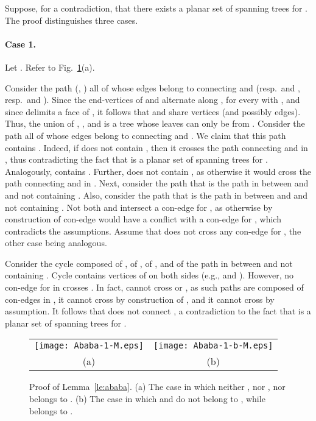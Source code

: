 \documentclass[letter,runningheads]{llncs}
\renewenvironment{proof}
{{\em Proof.\ }}{\hspace*{\fill}\par\vspace{2mm}}
\begin{document}
\begin{proof}
Suppose, for a contradiction, that there exists a planar set  of spanning trees for . The proof distinguishes three cases.

\paragraph{Case 1.} Let . Refer to Fig.~\ref{fig:ababa}(a).

Consider the path  (, ) all of whose edges belong to  connecting  and  (resp.\  and , resp.\  and ). Since the end-vertices of  and  alternate along , for every  with , and since  delimits a face of , it follows that  and  share vertices (and possibly edges). Thus, the union of , , and  is a tree  whose leaves can only be from . Consider the path  all of whose edges belong to  connecting  and . We claim that this path contains . Indeed, if  does not contain , then it crosses the path connecting  and  in , thus contradicting the fact that  is a planar set of spanning trees for . Analogously,  contains . Further,  does not contain , as otherwise it would cross the path connecting  and  in . Next, consider the path  that is the path in  between  and  and not containing . Also, consider the path  that is the path in  between  and  and not containing . Not both  and  intersect a con-edge for , as otherwise by construction of  con-edge  would have a conflict with a con-edge for , which contradicts the assumptions. Assume that  does not cross any con-edge for , the other case being analogous.

Consider the cycle  composed of , of , of , and of the path  in  between  and  not containing . Cycle  contains vertices of  on both sides (e.g.,  and ). However, no con-edge  for  in  crosses . In fact,  cannot cross  or , as such paths are composed of con-edges in , it cannot cross  by construction of , and it cannot cross  by assumption. It follows that  does not connect , a contradiction to the fact that  is a planar set of spanning trees for .

\begin{figure}[tb]
\begin{center}
\begin{tabular}{c c}
\mbox{\texttt{[image: Ababa-1-M.eps]}} \hspace{1mm} &
\mbox{\texttt{[image: Ababa-1-b-M.eps]}}\\
(a) \hspace{1mm} & (b)
\end{tabular}
\caption{Proof of Lemma~\ref{le:ababa}. (a) The case in which neither , nor , nor  belongs to . (b) The case in which  and  do not belong to , while  belongs to .}
\label{fig:ababa}
\end{center}
\end{figure}


\end{proof}
\end{document}
